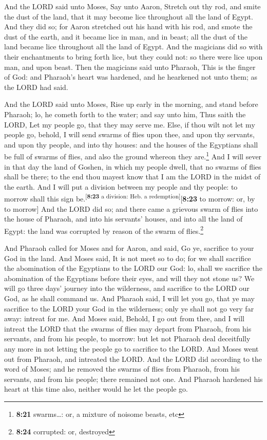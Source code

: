  And the LORD said unto Moses, Say unto Aaron, Stretch
out thy rod, and smite the dust of the land, that it may become lice
throughout all the land of Egypt.  And they did so; for
Aaron stretched out his hand with his rod, and smote the dust of the
earth, and it became lice in man, and in beast; all the dust of the land
became lice throughout all the land of Egypt.  And the
magicians did so with their enchantments to bring forth lice, but they
could not: so there were lice upon man, and upon beast. 
Then the magicians said unto Pharaoh, This is the finger of God: and
Pharaoh's heart was hardened, and he hearkened not unto them; as the
LORD had said.

 And the LORD said unto Moses, Rise up early in the
morning, and stand before Pharaoh; lo, he cometh forth to the water; and
say unto him, Thus saith the LORD, Let my people go, that they may serve
me.  Else, if thou wilt not let my people go, behold, I
will send swarms of flies upon thee, and upon thy servants, and upon thy
people, and into thy houses: and the houses of the Egyptians shall be
full of swarms of flies, and also the ground whereon they
are.\footnote{\textbf{8:21} swarms\ldots: or, a mixture of noisome
  beasts, etc}  And I will sever in that day the land of
Goshen, in which my people dwell, that no swarms of flies shall be
there; to the end thou mayest know that I am the LORD in the midst of
the earth.  And I will put a division between my people
and thy people: to morrow shall this sign
be.\textsuperscript{{[}\textbf{8:23} a division: Heb. a
redemption{]}}{[}\textbf{8:23} to morrow: or, by to morrow{]}
 And the LORD did so; and there came a grievous swarm of
flies into the house of Pharaoh, and into his servants' houses, and into
all the land of Egypt: the land was corrupted by reason of the swarm of
flies.\footnote{\textbf{8:24} corrupted: or, destroyed}

 And Pharaoh called for Moses and for Aaron, and said, Go
ye, sacrifice to your God in the land.  And Moses said,
It is not meet so to do; for we shall sacrifice the abomination of the
Egyptians to the LORD our God: lo, shall we sacrifice the abomination of
the Egyptians before their eyes, and will they not stone us?
 We will go three days' journey into the wilderness, and
sacrifice to the LORD our God, as he shall command us. 
And Pharaoh said, I will let you go, that ye may sacrifice to the LORD
your God in the wilderness; only ye shall not go very far away: intreat
for me.  And Moses said, Behold, I go out from thee, and
I will intreat the LORD that the swarms of flies may depart from
Pharaoh, from his servants, and from his people, to morrow: but let not
Pharaoh deal deceitfully any more in not letting the people go to
sacrifice to the LORD.  And Moses went out from Pharaoh,
and intreated the LORD.  And the LORD did according to
the word of Moses; and he removed the swarms of flies from Pharaoh, from
his servants, and from his people; there remained not one.
 And Pharaoh hardened his heart at this time also,
neither would he let the people go.

